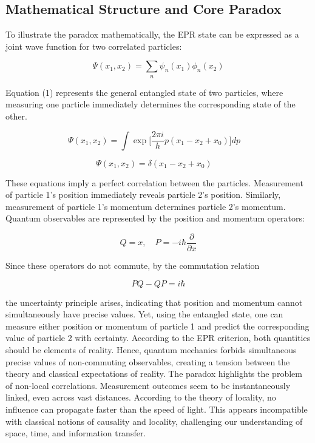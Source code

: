 \documentclass[14pt,a4paper]{extarticle}
\begin{document}
\subsection{Mathematical Structure and Core Paradox}

To illustrate the paradox mathematically, the EPR state can be expressed as a joint wave function for two correlated particles:

\begin{equation}
\Psi(x_1, x_2) = \sum_n \psi_n(x_1) \phi_n(x_2)
\end{equation}

Equation (1) represents the general entangled state of two particles, where measuring one particle immediately determines the corresponding state of the other.

\begin{equation}
\Psi(x_1, x_2) = \int \exp \Big[ \frac{2\pi i}{h} p (x_1 - x_2 + x_0) \Big] dp \quad
\end{equation}

\begin{equation}
\Psi(x_1, x_2) = \delta(x_1 - x_2 + x_0) \quad
\end{equation}

These equations imply a perfect correlation between the particles. Measurement of particle 1’s position immediately reveals particle 2’s position. Similarly, measurement of particle 1’s momentum determines particle 2’s momentum. Quantum observables are represented by the position and momentum operators:

\[
Q = x, \quad P = -i\hbar \frac{\partial}{\partial x}
\]

Since these operators do not commute, by the commutation relation

\[
PQ - QP = i\hbar
\]

the uncertainty principle arises, indicating that position and momentum cannot simultaneously have precise values. Yet, using the entangled state, one can measure either position or momentum of particle 1 and predict the corresponding value of particle 2 with certainty. According to the EPR criterion, both quantities should be elements of reality. Hence, quantum mechanics forbids simultaneous precise values of non-commuting observables, creating a tension between the theory and classical expectations of reality. The paradox highlights the problem of non-local correlations. Measurement outcomes seem to be instantaneously linked, even across vast distances. According to the theory of locality, no influence can propagate faster than the speed of light. This appears incompatible with classical notions of causality and locality, challenging our understanding of space, time, and information transfer.
\end{document}
